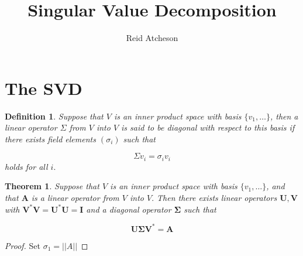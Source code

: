 \documentclass{article}
\newtheorem{definition}{Definition}
\newtheorem{theorem}{Theorem}
\newcommand{\norm}[1]{\left|\left|#1\right|\right|}
\begin{document}
\title{Singular Value Decomposition}
\author{Reid Atcheson}
\maketitle


\section{The SVD}


\begin{definition}
Suppose that $V$ is an inner product space with basis $\{v_1,\ldots\}$, then a linear operator $\Sigma$ from $V$ into $V$ is said to be
\emph{diagonal} with respect to this basis if there exists field elements $(\sigma_i)$ such that

\begin{equation*}
\Sigma v_i = \sigma _i v_i
\end{equation*}
holds for all $i.$

\end{definition}

\begin{theorem}
Suppose that $V$ is an inner product space with basis $\{v_1,\ldots\}$, and that $\mathbf{A}$ is a linear operator from $V$ into $V.$ Then
there exists linear operators $\mathbf{U},\mathbf{V}$ with $\mathbf{V}^*\mathbf{V} = \mathbf{U}^*\mathbf{U}=\mathbf{I}$ and a diagonal operator $\mathbf{\Sigma}$ such that

\begin{equation*}
\mathbf{U\Sigma V}^* = \mathbf{A}
\end{equation*}


\end{theorem}


\begin{proof}
Set $\sigma_1=\norm{A}$
\end{proof}
\end{document}
